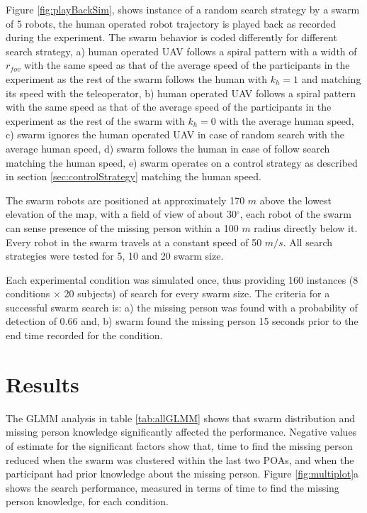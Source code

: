 \documentclass{article}
\begin{document}
Figure \ref{fig:playBackSim}, shows instance of a random search strategy by a swarm of 5 robots, the human operated robot trajectory is played back as recorded during the experiment. The swarm behavior is coded differently for different search strategy, a) human operated UAV follows a spiral pattern with a width of $r_{fov}$ with the same speed as that of the average speed of the participants in the experiment as the rest of the swarm follows the human with $k_h=1$ and matching its speed with the teleoperator, b) human operated UAV follows a spiral pattern with the same speed as that of the average speed of the participants in the experiment as the rest of the swarm with $k_h=0$ with the average human speed, c) swarm ignores the human operated UAV  in case of random search with the average human speed, d) swarm follows the human in case of follow search matching the human speed, e) swarm operates on a control strategy as described in section \ref{sec:controlStrategy} matching the human speed.

The swarm robots are positioned at approximately 170 $m$ above the lowest elevation of the map, with a field of view of about 30$^{\circ}$, each robot of the swarm can sense presence of the missing person within a 100 $m$ radius directly below it. Every robot in the swarm travels at a constant speed of 50 $m/s$. All search strategies were tested for 5, 10 and 20 swarm size.

Each experimental condition was simulated once, thus providing 160 instances (8 conditions $\times$ 20 subjects) of search for every swarm size. The criteria for a successful swarm search is: a) the missing person was found with a probability of detection of 0.66 and, b) swarm found the missing person 15 seconds prior to the end time recorded for the condition. 

\section{Results}
The GLMM analysis in table \ref{tab:allGLMM} shows that swarm distribution and missing person knowledge significantly affected the performance. Negative values of estimate for the significant factors show that, time to find the missing person reduced when the swarm was clustered within the last two POAs, and when the participant had prior knowledge about the missing person. Figure \ref{fig:multiplot}a shows the search performance, measured in terms of time to find the missing person knowledge, for each condition.
\end{document}
